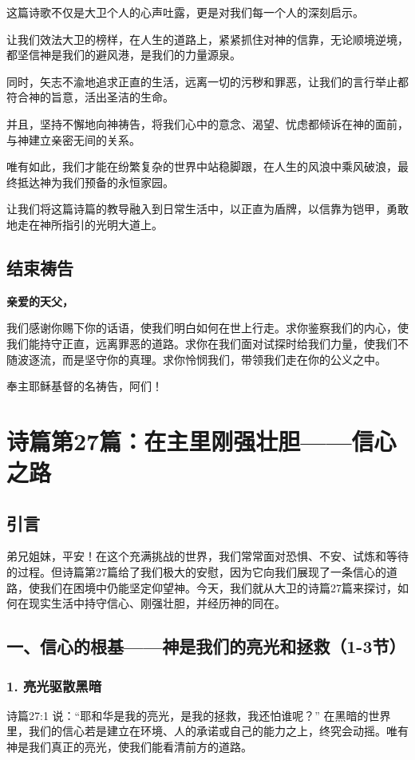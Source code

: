 \documentclass[a4paper, 12pt]{article}
\begin{document}
这篇诗歌不仅是大卫个人的心声吐露，更是对我们每一个人的深刻启示。

让我们效法大卫的榜样，在人生的道路上，紧紧抓住对神的信靠，无论顺境逆境，都坚信神是我们的避风港，是我们的力量源泉。

同时，矢志不渝地追求正直的生活，远离一切的污秽和罪恶，让我们的言行举止都符合神的旨意，活出圣洁的生命。

并且，坚持不懈地向神祷告，将我们心中的意念、渴望、忧虑都倾诉在神的面前，与神建立亲密无间的关系。

唯有如此，我们才能在纷繁复杂的世界中站稳脚跟，在人生的风浪中乘风破浪，最终抵达神为我们预备的永恒家园。

让我们将这篇诗篇的教导融入到日常生活中，以正直为盾牌，以信靠为铠甲，勇敢地走在神所指引的光明大道上。

\subsection*{结束祷告}

\textbf{亲爱的天父，}

我们感谢你赐下你的话语，使我们明白如何在世上行走。求你鉴察我们的内心，使我们能持守正直，远离罪恶的道路。求你在我们面对试探时给我们力量，使我们不随波逐流，而是坚守你的真理。求你怜悯我们，带领我们走在你的公义之中。

奉主耶稣基督的名祷告，阿们！
\newpage
\section{诗篇第27篇：在主里刚强壮胆——信心之路}
\subsection*{引言}
弟兄姐妹，平安！在这个充满挑战的世界，我们常常面对恐惧、不安、试炼和等待的过程。但诗篇第27篇给了我们极大的安慰，因为它向我们展现了一条信心的道路，使我们在困境中仍能坚定仰望神。今天，我们就从大卫的诗篇27篇来探讨，如何在现实生活中持守信心、刚强壮胆，并经历神的同在。

\subsection*{一、信心的根基——神是我们的亮光和拯救（1-3节）}
\subsubsection*{1. 亮光驱散黑暗}
\hspace{0.6cm}诗篇27:1 说：“耶和华是我的亮光，是我的拯救，我还怕谁呢？” 在黑暗的世界里，我们的信心若是建立在环境、人的承诺或自己的能力之上，终究会动摇。唯有神是我们真正的亮光，使我们能看清前方的道路。
\end{document}
